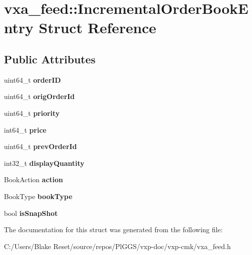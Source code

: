 \hypertarget{structvxa__feed_1_1_incremental_order_book_entry}{}\section{vxa\+\_\+feed\+::Incremental\+Order\+Book\+Entry Struct Reference}
\label{structvxa__feed_1_1_incremental_order_book_entry}
\subsection*{Public Attributes}
\begin{DoxyCompactItemize}
\item 
\mbox{\label{structvxa__feed_1_1_incremental_order_book_entry_a430837f2bc295d3434dca389850a086b}} 
uint64\+\_\+t {\bfseries order\+ID}
\item 
\mbox{\label{structvxa__feed_1_1_incremental_order_book_entry_a5f21ba2214b9256ad62ca221ad6d5e21}} 
uint64\+\_\+t {\bfseries orig\+Order\+Id}
\item 
\mbox{\label{structvxa__feed_1_1_incremental_order_book_entry_a9c6360d09e56391347d14ce35b0d22a5}} 
uint64\+\_\+t {\bfseries priority}
\item 
\mbox{\label{structvxa__feed_1_1_incremental_order_book_entry_a0c19b5a733c923ca64fac6558c31a971}} 
int64\+\_\+t {\bfseries price}
\item 
\mbox{\label{structvxa__feed_1_1_incremental_order_book_entry_a0ccd2326c06c70c5bfa99b756c09d251}} 
uint64\+\_\+t {\bfseries prev\+Order\+Id}
\item 
\mbox{\label{structvxa__feed_1_1_incremental_order_book_entry_aecea0fd519c21740caef79d81aeeb202}} 
int32\+\_\+t {\bfseries display\+Quantity}
\item 
\mbox{\label{structvxa__feed_1_1_incremental_order_book_entry_a08922f3e7fa99d9c681e32ea98211350}} 
Book\+Action {\bfseries action}
\item 
\mbox{\label{structvxa__feed_1_1_incremental_order_book_entry_a8dab0793fca05724edff12f9b312e199}} 
Book\+Type {\bfseries book\+Type}
\item 
\mbox{\label{structvxa__feed_1_1_incremental_order_book_entry_a01ba1f3377563b09a5a4ccf9b376ab34}} 
bool {\bfseries is\+Snap\+Shot}
\end{DoxyCompactItemize}


The documentation for this struct was generated from the following file\+:\begin{DoxyCompactItemize}
\item 
C\+:/\+Users/\+Blake Reset/source/repos/\+Pl\+G\+G\+S/vxp-\/doc/vxp-\/cmk/vxa\+\_\+feed.\+h\end{DoxyCompactItemize}
